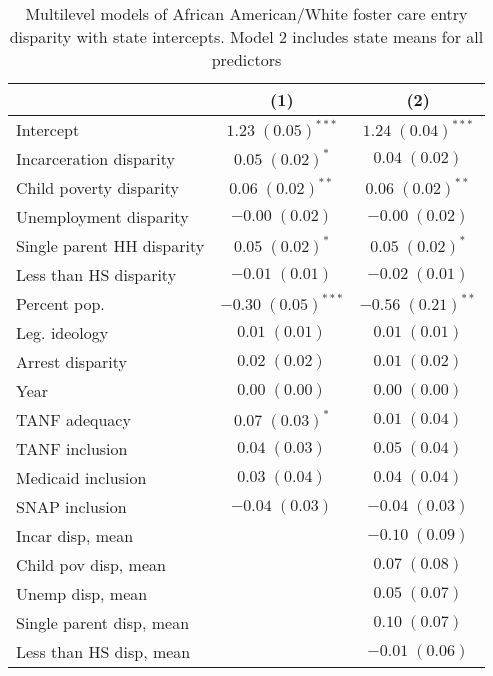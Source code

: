 
\begin{table}
\caption{Multilevel models of African American/White foster care entry disparity with state intercepts. Model 2 includes state means for all predictors }
\begin{center}
\begin{tabular}{l c c }
\hline
 & (1) & (2) \\
\hline
Intercept                  & $1.23 \; (0.05)^{***}$  & $1.24 \; (0.04)^{***}$ \\
Incarceration disparity    & $0.05 \; (0.02)^{*}$    & $0.04 \; (0.02)$       \\
Child poverty disparity    & $0.06 \; (0.02)^{**}$   & $0.06 \; (0.02)^{**}$  \\
Unemployment disparity     & $-0.00 \; (0.02)$       & $-0.00 \; (0.02)$      \\
Single parent HH disparity & $0.05 \; (0.02)^{*}$    & $0.05 \; (0.02)^{*}$   \\
Less than HS disparity     & $-0.01 \; (0.01)$       & $-0.02 \; (0.01)$      \\
Percent pop.               & $-0.30 \; (0.05)^{***}$ & $-0.56 \; (0.21)^{**}$ \\
Leg. ideology              & $0.01 \; (0.01)$        & $0.01 \; (0.01)$       \\
Arrest disparity           & $0.02 \; (0.02)$        & $0.01 \; (0.02)$       \\
Year                       & $0.00 \; (0.00)$        & $0.00 \; (0.00)$       \\
TANF adequacy              & $0.07 \; (0.03)^{*}$    & $0.01 \; (0.04)$       \\
TANF inclusion             & $0.04 \; (0.03)$        & $0.05 \; (0.04)$       \\
Medicaid inclusion         & $0.03 \; (0.04)$        & $0.04 \; (0.04)$       \\
SNAP inclusion             & $-0.04 \; (0.03)$       & $-0.04 \; (0.03)$      \\
Incar disp, mean           &                         & $-0.10 \; (0.09)$      \\
Child pov disp, mean       &                         & $0.07 \; (0.08)$       \\
Unemp disp, mean           &                         & $0.05 \; (0.07)$       \\
Single parent disp, mean   &                         & $0.10 \; (0.07)$       \\
Less than HS disp, mean    &                         & $-0.01 \; (0.06)$      \\

\end{tabular}
\end{center}
\end{table}
